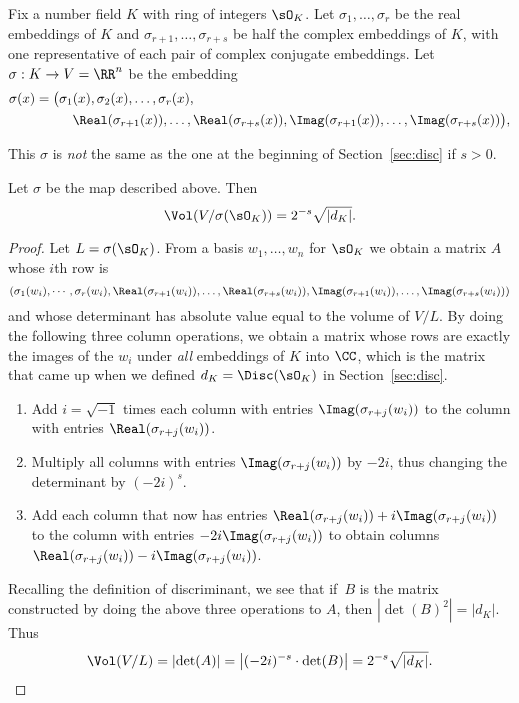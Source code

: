 Fix a number field $K$ with ring of integers $\sO_K$.
Let $\sigma_1,\dots, \sigma_r$ be the real embeddings
of $K$ and $\sigma_{r+1},\dots, \sigma_{r+s}$ be half
the complex embeddings of $K$, with one representative of
each pair of complex conjugate embeddings.
Let $\sigma:K \to V=\RR^n$ be the embedding
\begin{align*}
\sigma(x) = \big(&\sigma_1(x), \sigma_2(x),\dots, \sigma_r(x), \\
&\quad \Real(\sigma_{r+1}(x)), \dots, \Real(\sigma_{r+s}(x)),
\Imag(\sigma_{r+1}(x)), \dots, \Imag(\sigma_{r+s}(x))\big),
\end{align*}
\begin{warning}
	This $\sigma$ is {\em not} the same as the one
	at the beginning of Section~\ref{sec:disc} if $s>0$.
\end{warning}
\begin{lemma}\label{lem:volok}
	Let $\sigma$ be the map described above. Then
	$$
	\Vol(V/\sigma(\sO_K)) = 2^{-s} \sqrt{\left|d_K\right|}.
	$$
\end{lemma}
\begin{proof}
	Let $L=\sigma(\sO_K)$.
	From a basis $w_1,\dots, w_n$ for $\sO_K$ we obtain a matrix $A$
	whose $i$th row is
	$$
	(\sigma_1(w_i), \cdots, \sigma_r(w_i),
	\Real(\sigma_{r+1}(w_i)),\dots, \Real(\sigma_{r+s}(w_i)),
	\Imag(\sigma_{r+1}(w_i)),\dots, \Imag(\sigma_{r+s}(w_i)))
	$$
	and whose determinant has absolute value equal to the volume
	of $V/L$.  By doing the following three column operations,
	we obtain a matrix whose rows are exactly the images of
	the $w_i$ under {\em all} embeddings of $K$ into $\CC$, which
	is the matrix that came up when we defined
	$d_K=\Disc(\sO_K)$ in Section~\ref{sec:disc}.
	\begin{enumerate}
		\item
		Add $i=\sqrt{-1}$ times each column with entries $\Imag(\sigma_{r+j}(w_i))$
		to the column with entries $\Real(\sigma_{r+j}(w_i))$.
		\item
		Multiply all columns with entries $\Imag(\sigma_{r+j}(w_i))$
		by $-2i$, thus changing the determinant by $(-2i)^s$.
		\item
		Add each column that now has entries
		$\Real(\sigma_{r+j}(w_i))+i\Imag(\sigma_{r+j}(w_i))$
		to the column with entries $-2i\Imag(\sigma_{r+j}(w_i))$
		to obtain columns $\Real(\sigma_{r+j}(w_i))-i\Imag(\sigma_{r+j}(w_i))$.
	\end{enumerate}
	Recalling the definition of discriminant, we see that if~$B$
	is the matrix constructed by doing the above three
	operations to $A$, then $\left|\det(B)^2\right| = \left|d_K\right|$.
	Thus
	$$
	\Vol(V/L)
	= \left|\det(A)\right|
	= \left|(-2i)^{-s}\cdot \det(B)\right|
	= 2^{-s}\sqrt{\left|d_K\right|}.
	$$
\end{proof}

